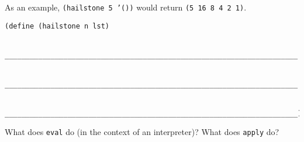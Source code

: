 \documentclass[twoside]{article}
\begin{document}
\begin{enumerate}
As an example, {\tt (hailstone 5 '())} would return {\tt (5 16 8 4 2 1)}.

\begin{lstlisting}
(define (hailstone n lst)

    ______________________________________________________________________

    ______________________________________________________________________
    
    ______________________________________________________________________)
\end{lstlisting}


What does {\tt eval} do (in the context of an interpreter)? What does {\tt apply} do?

\end{enumerate}
\end{document}
